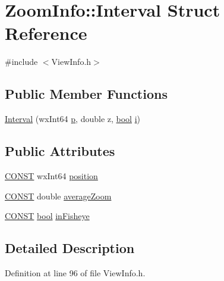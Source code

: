 \hypertarget{struct_zoom_info_1_1_interval}{}\section{Zoom\+Info\+:\+:Interval Struct Reference}
\label{struct_zoom_info_1_1_interval}


{\ttfamily \#include $<$View\+Info.\+h$>$}

\subsection*{Public Member Functions}
\begin{DoxyCompactItemize}
\item 
\hyperlink{struct_zoom_info_1_1_interval_a0ac6529c6f007113f59b1807d6beb087}{Interval} (wx\+Int64 \hyperlink{xmltok_8h_a94b60f3beb36ae85555d36dc9816769c}{p}, double z, \hyperlink{mac_2config_2i386_2lib-src_2libsoxr_2soxr-config_8h_abb452686968e48b67397da5f97445f5b}{bool} \hyperlink{checksum_8c_ab80e330a3bc9e38c1297fe17381e92b4}{i})
\end{DoxyCompactItemize}
\subsection*{Public Attributes}
\begin{DoxyCompactItemize}
\item 
\hyperlink{_view_info_8h_a0c33b494a68ce28497e7ce8e5e95feff}{C\+O\+N\+ST} wx\+Int64 \hyperlink{struct_zoom_info_1_1_interval_ac3f8da7b5b0cad2e844ecc9b036a49d4}{position}
\item 
\hyperlink{_view_info_8h_a0c33b494a68ce28497e7ce8e5e95feff}{C\+O\+N\+ST} double \hyperlink{struct_zoom_info_1_1_interval_a138a235770b11a7cdc6566e9aea6958f}{average\+Zoom}
\item 
\hyperlink{_view_info_8h_a0c33b494a68ce28497e7ce8e5e95feff}{C\+O\+N\+ST} \hyperlink{mac_2config_2i386_2lib-src_2libsoxr_2soxr-config_8h_abb452686968e48b67397da5f97445f5b}{bool} \hyperlink{struct_zoom_info_1_1_interval_a5180c3576f2a5b226b3c95ba0e3a64d1}{in\+Fisheye}
\end{DoxyCompactItemize}


\subsection{Detailed Description}


Definition at line 96 of file View\+Info.\+h.



